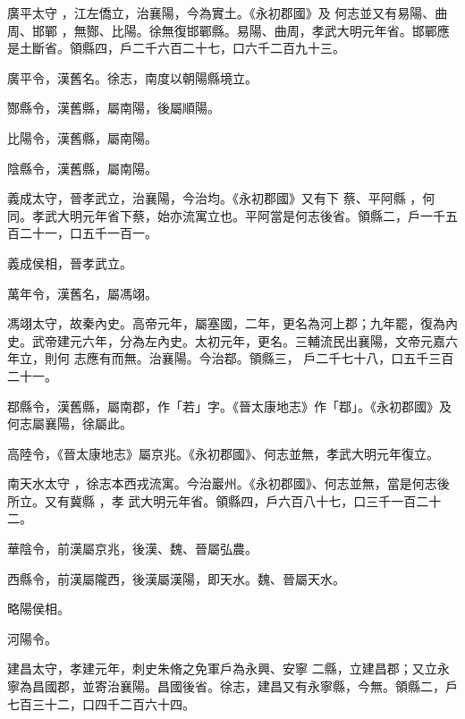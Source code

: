 \begin{pinyinscope}
廣平太守
 ，江左僑立，治襄陽，今為實土。《永初郡國》及
 何志並又有易陽、曲周、邯鄲
 ，無酂、比陽。徐無復邯鄲縣。易陽、曲周，孝武大明元年省。邯鄲應是土斷省。領縣四，戶二千六百二十七，口六千二百九十三。



 廣平令，漢舊名。徐志，南度以朝陽縣境立。



 酂縣令，漢舊縣，屬南陽，後屬順陽。



 比陽令，漢舊縣，屬南陽。



 陰縣令，漢舊縣，屬南陽。


義成太守，晉孝武立，治襄陽，今治均。《永初郡國》又有下
 蔡、平阿縣
 ，何同。孝武大明元年省下蔡，始亦流寓立也。平阿當是何志後省。領縣二，戶一千五百二十一，口五千一百一。



 義成侯相，晉孝武立。



 萬年令，漢舊名，屬馮翊。


馮翊太守，故秦內史。高帝元年，屬塞國，二年，更名為河上郡；九年罷，復為內史。武帝建元六年，分為左內史。太初元年，更名。三輔流民出襄陽，文帝元嘉六年立，則何
 志應有而無。治襄陽。今治鄀。領縣三，
 戶二千七十八，口五千三百二十一。



 鄀縣令，漢舊縣，屬南郡，作「若」字。《晉太康地志》作「鄀」。《永初郡國》及何志屬襄陽，徐屬此。



 高陸令，《晉太康地志》屬京兆。《永初郡國》、何志並無，孝武大明元年復立。


南天水太守
 ，徐志本西戎流寓。今治巖州。《永初郡國》、何志並無，當是何志後所立。又有冀縣
 ，孝
 武大明元年省。領縣四，戶六百八十七，口三千一百二十二。



 華陰令，前漢屬京兆，後漢、魏、晉屬弘農。



 西縣令，前漢屬隴西，後漢屬漢陽，即天水。魏、晉屬天水。


略陽侯相。


河陽令。



 建昌太守，孝建元年，刺史朱脩之免軍戶為永興、安寧
 二縣，立建昌郡；又立永寧為昌國郡，並寄治襄陽。昌國後省。徐志，建昌又有永寧縣，今無。領縣二，戶七百三十二，口四千二百六十四。




\end{pinyinscope}
